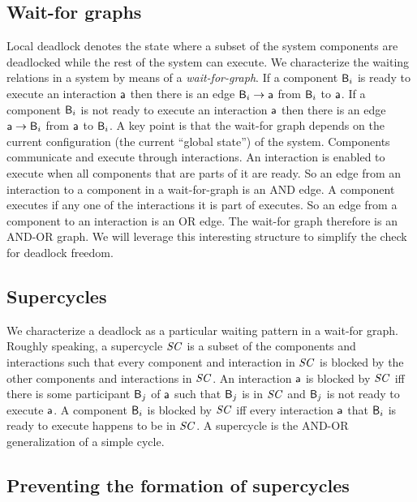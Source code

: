 \subsection{Wait-for graphs}

Local deadlock denotes the state where a subset of the system components are deadlocked while the rest of the system can execute.
%
We characterize the waiting relations in a system by means of a {\em wait-for-graph}. 
If a component $\mathsf{B}_i$ is ready to execute an interaction $\mathsf{a}$ then there is an edge $\mathsf{B}_i \rightarrow \mathsf{a}$ from $\mathsf{B}_i$ to $\mathsf{a}$.
If a component $\mathsf{B}_i$ is not ready to execute an interaction $\mathsf{a}$ then there is an edge $\mathsf{a} \rightarrow \mathsf{B}_i$ from $\mathsf{a}$ to $\mathsf{B}_i$.
A key point is that the wait-for graph depends on the current configuration (\ie the current ``global state'') of the system.
%
Components communicate and execute through interactions. 
An interaction is enabled to execute when all components that 
are parts of it are ready. 
So an edge from an interaction to a component in a wait-for-graph
is an AND edge. 
A component executes if any one of the interactions it is part of
executes. So an edge from a component to an interaction is an OR
edge. 
The wait-for graph therefore is an AND-OR graph. 
We will leverage this interesting structure to simplify the
check for deadlock freedom. 



\subsection{Supercycles}

We characterize a deadlock as a particular waiting pattern in a wait-for graph.
Roughly speaking, a supercycle $\mathit{SC}$ is a subset of the components and interactions such that every component and interaction in $\mathit{SC}$ is blocked by
the other components and interactions in $\mathit{SC}$. 
An interaction $\mathsf{a}$ is blocked by $\mathit{SC}$ iff there is some participant $\mathsf{B}_j$ of $\mathsf{a}$ such that $\mathsf{B}_j$ is in $\mathit{SC}$ and $\mathsf{B}_j$ is not ready to
execute $\mathsf{a}$.
A component $\mathsf{B}_i$ is blocked by $\mathit{SC}$ iff every interaction $\mathsf{a}$ that $\mathsf{B}_i$ is ready to execute happens to be in $\mathit{SC}$.
A supercycle is the AND-OR generalization of a simple cycle.



\subsection{Preventing the formation of supercycles}

